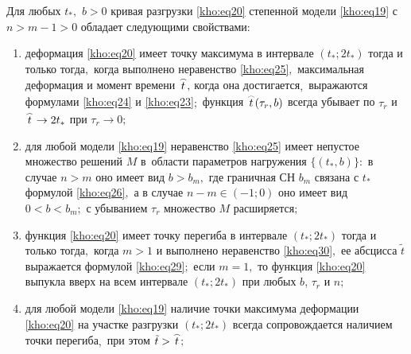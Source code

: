 \pagebreak



\hypertarget{kh:th3}{} 



\smallskip



\begin{theorem}[3] \label{kho:teo3} Для любых $t_\ast,$ $b>0$ кривая разгрузки \eqref{kho:eq20} степенной модели \eqref{kho:eq19} с $n>m-1>0$ обладает следующими свойствами\/$:$

\begin{enumerate}

\item[\rm 1)] деформация \eqref{kho:eq20} имеет точку максимума в интервале $(t_\ast;2t_\ast)$ тогда и только тогда$,$ когда выполнено неравенство \eqref{kho:eq25}$,$ максимальная деформация и момент времени $\mathord{\buildrel{\lower3pt\hbox{$\scriptscriptstyle\frown$}}\over{t}},$ когда она достигается$,$ выражаются формулами \eqref{kho:eq24} и \eqref{kho:eq23}$;$ функция $\mathord{\buildrel{\lower3pt\hbox{$\scriptscriptstyle\frown$}}\over{t}}(\tau_r,b)$ всегда убывает по $\tau_r$  и $\mathord{\buildrel{\lower3pt\hbox{$\scriptscriptstyle\frown$}}\over{t}}\to2t_\ast$ при $\tau_r\to0;$ 



\item[\rm 2)] для любой модели \eqref{kho:eq19} неравенство \eqref{kho:eq25} имеет непустое множество решений $M$ в~области параметров нагружения $\{(t_\ast,b)\}{:}$ в случае ${n>m}$ оно имеет вид $b>b_m,$ где граничная СН $b_m$ связана с $t_\ast$ формулой \eqref{kho:eq26}$,$ а в случае ${n-m}\in(-1;0)$ оно имеет вид $0<b<b_m;$ с убыванием $\tau_r$ множество $M$ расширяется\/$;$



\item[\rm 3)] функция \eqref{kho:eq20} имеет точку перегиба в интервале $(t_\ast;2t_\ast)$ тогда и только тогда$,$ когда $m>1$ и выполнено неравенство \eqref{kho:eq30}$,$ ее абсцисса $\tilde{t}$ выражается формулой \eqref{kho:eq29}$;$ если $m=1,$ то функция \eqref{kho:eq20} выпукла вверх на всем интервале $(t_\ast;2t_\ast)$ при любых $b$, $\tau_r$ и $n;$



\item[\rm 4)] для любой модели \eqref{kho:eq19} наличие точки максимума деформации \eqref{kho:eq20} на участке разгрузки $(t_\ast;2t_\ast)$ всегда сопровождается наличием точки перегиба$,$ при этом $\tilde{t}>\mathord{\buildrel{\lower3pt\hbox{$\scriptscriptstyle\frown$}}\over{t}};$




\end{enumerate}
\end{theorem}

